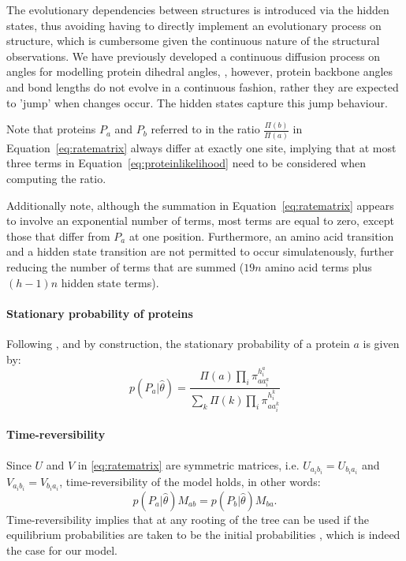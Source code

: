 \documentclass[nogrid]{MBE}%
\begin{document}
The evolutionary dependencies between structures is introduced via the hidden states, thus avoiding having to directly implement an evolutionary process on structure, which is cumbersome given the continuous nature of the structural observations. We have previously developed a continuous diffusion process on angles for modelling protein dihedral angles, \citep{Garcia-Portugues:ads, Golden2017}, however,  protein backbone angles and bond lengths do not evolve in a continuous fashion, rather they are expected to 'jump' when changes occur. The hidden states capture this jump behaviour.
 
Note that proteins $P_a$ and $P_b$ referred to in the ratio $\frac{\Pi(b)}{\Pi(a)}$ in Equation~\ref{eq:ratematrix} always differ at exactly one site, implying that at most three terms in Equation~\ref{eq:proteinlikelihood} need to be considered when computing the ratio. 

Additionally note, although the summation in Equation~\ref{eq:ratematrix} appears to involve an exponential number of terms, most terms are equal to zero, except those that differ from $P_a$ at one position. Furthermore, an amino acid transition and a hidden state transition are not permitted to occur simulatenously, further reducing the number of terms that are summed ($19n$ amino acid terms plus $(h-1)n$ hidden state terms).


\paragraph{Stationary probability of proteins}
Following \citet{choi2008basing}, and by construction, the stationary probability of a protein $a$ is given by:
\begin{equation}
\label{eq:stationary_dist}
p(P_a|\hat{\theta}) = \frac{ \Pi(a) \underset{i}{\prod}\pi^{h^{a}_{i}}_{aa^{a}_{i}} }{ \sum_{k} \Pi(k) \underset{i}{\prod}\pi^{h^{k}_{i}}_{aa^{k}_{i}} } 
\end{equation}


\paragraph{Time-reversibility}
Since $U$ and $V$ in \eqref{eq:ratematrix} are symmetric matrices, i.e. $U_{a_{i}b_{i}}=U_{b_{i}a_{i}}$ and $V_{a_{i}b_{i}}=V_{b_{i}a_{i}}$, time-reversibility of the model holds, in other words:
\begin{equation}
p(P_a|\hat{\theta})M_{ab} = p(P_b|\hat{\theta})M_{ba}.
\end{equation}
Time-reversibility implies that at any rooting of the tree can be used if the equilibrium probabilities are taken to be the initial probabilities \citep{felsenstein1981evolutionary}, which is indeed the case for our model.
\end{document}
